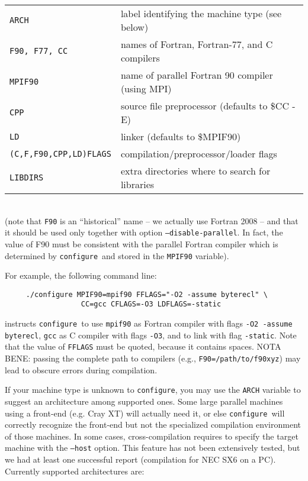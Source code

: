 \documentclass[12pt,a4paper]{article}
\def\configure{\texttt{configure}}
\begin{document}
\begin{tabular}{ll}
\texttt{ARCH}& label identifying the machine type (see below)\\
\texttt{F90, F77, CC} &names of Fortran, Fortran-77, and C compilers\\
\texttt{MPIF90} &       name of parallel Fortran 90 compiler (using MPI)\\
\texttt{CPP} &          source file preprocessor (defaults to \$CC -E)\\
\texttt{LD} &           linker (defaults to \$MPIF90)\\
\texttt{(C,F,F90,CPP,LD)FLAGS}& compilation/preprocessor/loader flags\\
\texttt{LIBDIRS}&     extra directories where to search for libraries\\
\end{tabular}\\
(note that \texttt{F90} is an ``historical'' name -- we actually use
Fortran 2008 -- and that it should be used only together with option
\texttt{--disable-parallel}. In fact, the value of F90 must be
consistent with the parallel Fortran compiler which is determined by
\configure\ and stored in the \texttt{MPIF90} variable).

For example, the following command line:
\begin{verbatim}
     ./configure MPIF90=mpif90 FFLAGS="-O2 -assume byterecl" \
                  CC=gcc CFLAGS=-O3 LDFLAGS=-static
\end{verbatim}
instructs \configure\ to use \texttt{mpif90} as Fortran compiler
with flags \texttt{-O2 -assume byterecl}, \texttt{gcc} as C compiler with
flags \texttt{-O3}, and to link with flag \texttt{-static}.
Note that the value of \texttt{FFLAGS} must be quoted, because it contains
spaces. NOTA BENE: passing the complete path to compilers (e.g.,
\texttt{F90=/path/to/f90xyz}) may lead to obscure errors during
compilation.

If your machine type is unknown to \configure, you may use the
\texttt{ARCH}
variable to suggest an architecture among supported ones. Some large
parallel machines using a front-end (e.g. Cray XT) will actually
need it, or else \configure\ will correctly recognize the front-end
but not the specialized compilation environment of those machines.
In some cases, cross-compilation requires to specify the target machine
with the \texttt{--host} option. This feature has not been extensively
tested, but we had at least one successful report (compilation
for NEC SX6 on a PC). Currently supported architectures are:
\end{document}
